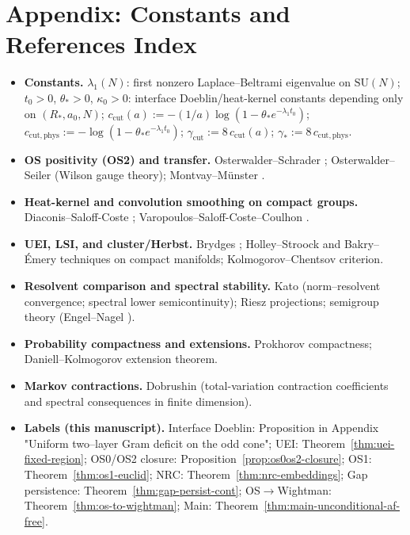 \documentclass[11pt]{amsart}
\theoremstyle{plain}
\theoremstyle{definition}
\theoremstyle{remark}
\begin{document}
\section*{Appendix: Constants and References Index}
\begin{itemize}
  \item \textbf{Constants.} $\lambda_1(N)$: first nonzero Laplace--Beltrami eigenvalue on $\mathrm{SU}(N)$; $t_0>0$, $\theta_*>0$, $\kappa_0>0$: interface Doeblin/heat-kernel constants depending only on $(R_*,a_0,N)$; $c_{\mathrm{cut}}(a):=-(1/a)\log(1-\theta_* e^{-\lambda_1 t_0})$; $c_{\mathrm{cut,phys}}:= -\log(1-\theta_* e^{-\lambda_1 t_0})$; $\gamma_{\mathrm{cut}}:=8\,c_{\mathrm{cut}}(a)$; $\gamma_*:=8\,c_{\mathrm{cut,phys}}$.
  \item \textbf{OS positivity (OS2) and transfer.} Osterwalder--Schrader \cite{Osterwalder1973,Osterwalder1975}; Osterwalder--Seiler \cite{OsterwalderSeiler1978} (Wilson gauge theory); Montvay--M\"unster \cite{MontvayMunster1994}.
  \item \textbf{Heat-kernel and convolution smoothing on compact groups.} Diaconis--Saloff-Coste \cite{DiaconisSaloffCoste2004}; Varopoulos--Saloff-Coste--Coulhon \cite{VaropoulosSaloffCosteCoulhon1992}.
  \item \textbf{UEI, LSI, and cluster/Herbst.} Brydges \cite{Brydges1978,Brydges1986}; Holley--Stroock and Bakry--\'Emery techniques on compact manifolds; Kolmogorov--Chentsov criterion.
  \item \textbf{Resolvent comparison and spectral stability.} Kato \cite{Kato1995} (norm--resolvent convergence; spectral lower semicontinuity); Riesz projections; semigroup theory (Engel--Nagel \cite{EngelNagel2000}).
  \item \textbf{Probability compactness and extensions.} Prokhorov compactness; Daniell--Kolmogorov extension theorem.
  \item \textbf{Markov contractions.} Dobrushin \cite{Dobrushin1970} (total-variation contraction coefficients and spectral consequences in finite dimension).
  \item \textbf{Labels (this manuscript).} Interface Doeblin: Proposition in Appendix "Uniform two--layer Gram deficit on the odd cone"; UEI: Theorem~\ref{thm:uei-fixed-region}; OS0/OS2 closure: Proposition~\ref{prop:os0os2-closure}; OS1: Theorem~\ref{thm:os1-euclid}; NRC: Theorem~\ref{thm:nrc-embeddings}; Gap persistence: Theorem~\ref{thm:gap-persist-cont}; OS$\to$Wightman: Theorem~\ref{thm:os-to-wightman}; Main: Theorem~\ref{thm:main-unconditional-af-free}.
\end{itemize}
\end{document}
